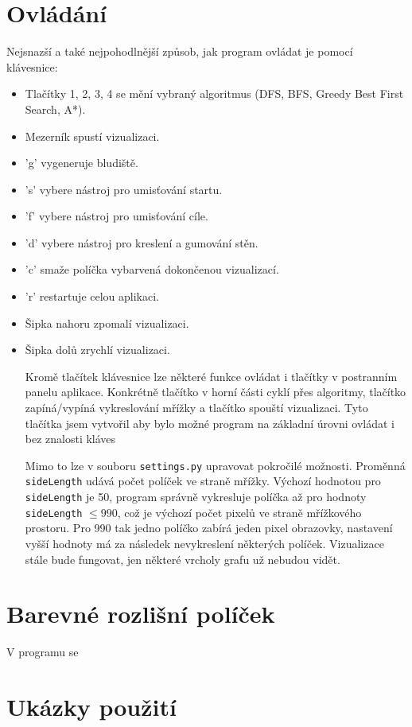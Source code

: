 \documentclass[12pt]{report}			%
\begin{document}
			\section{Ovládání}
			Nejsnazší a také nejpohodlnější způsob, jak program ovládat je pomocí klávesnice:
			\begin{itemize}
			\item Tlačítky 1, 2, 3, 4 se mění vybraný algoritmus (DFS, BFS, Greedy Best First Search, A*).
\item Mezerník spustí vizualizaci.
\item 'g' vygeneruje bludiště.
\item 's' vybere nástroj pro umisťování startu.
\item 'f' vybere nástroj pro umisťování cíle.
\item 'd' vybere nástroj pro kreslení a gumování stěn.
\item 'c' smaže políčka vybarvená dokončenou vizualizací.
\item 'r' restartuje celou aplikaci.
\item Šipka nahoru zpomalí vizualizaci.
\item Šipka dolů zrychlí vizualizaci.

			Kromě tlačítek klávesnice lze některé funkce ovládat i tlačítky v postranním panelu aplikace. Konkrétně tlačítko v horní části cyklí přes algoritmy, tlačítko  zapíná/vypíná vykreslování mřížky a tlačítko  spouští vizualizaci. Tyto tlačítka jsem vytvořil aby bylo možné program na základní úrovni ovládat i bez znalosti kláves
			
			
			Mimo to lze v souboru \texttt{settings.py} upravovat pokročilé možnosti. Proměnná \texttt{sideLength} udává počet políček ve straně mřížky. Výchozí hodnotou pro \texttt{sideLength} je 50, program správně vykresluje políčka až pro hodnoty \texttt{sideLength} $\leq 990$, což je výchozí počet pixelů ve straně mřížkového prostoru. Pro 990 tak jedno políčko zabírá jeden pixel obrazovky, nastavení vyšší hodnoty má za následek nevykreslení některých políček. Vizualizace stále bude fungovat, jen některé vrcholy grafu už nebudou vidět.
			\end{itemize}
			\section{Barevné rozlišní políček}
			V programu se 
			\section{Ukázky použití}	
			
\end{document}
